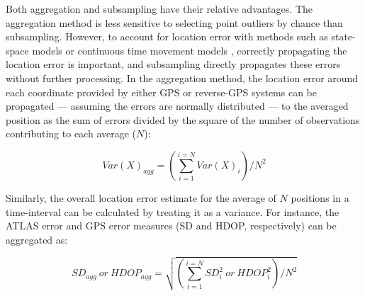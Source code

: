 \begin{refsection}
    Both aggregation and subsampling have their relative advantages. 
    The aggregation method is less sensitive to selecting point outliers by chance than subsampling.
    However, to account for location error with methods such as state-space models \citep{jonsen2003, jonsen2005, johnson2008} or continuous time movement models \citep{fleming2014a, noonan2019, gurarie2017, calabrese2016, fleming2020}, correctly propagating the location error is important, and subsampling directly propagates these errors without further processing.
    In the aggregation method, the location error around each coordinate provided by either GPS or reverse-GPS systems can be propagated --- assuming the errors are normally distributed --- to the averaged position as the sum of errors divided by the square of the number of observations contributing to each average ($N$):
    \begin{linenomath*}
        \begin{equation*}
            Var(X)_{agg} = \left( \sum_{i=1}^{i=N} Var(X)_i \right) / N ^ 2
        \end{equation*}
    \end{linenomath*}
    Similarly, the overall location error estimate for the average of $N$ positions in a time-interval can be calculated by treating it as a variance. For instance, the ATLAS error and GPS error measures (SD and HDOP, respectively) can be aggregated as:
    \begin{linenomath*}
        \begin{equation*}
            SD_{agg} \ or \ HDOP_{agg} = \sqrt{ \left( \sum_{i=1}^{i=N} SD_i^2 \ or \ HDOP_i^2 \right) / N ^ 2  }
        \end{equation*}    
    \end{linenomath*}


\end{refsection}
